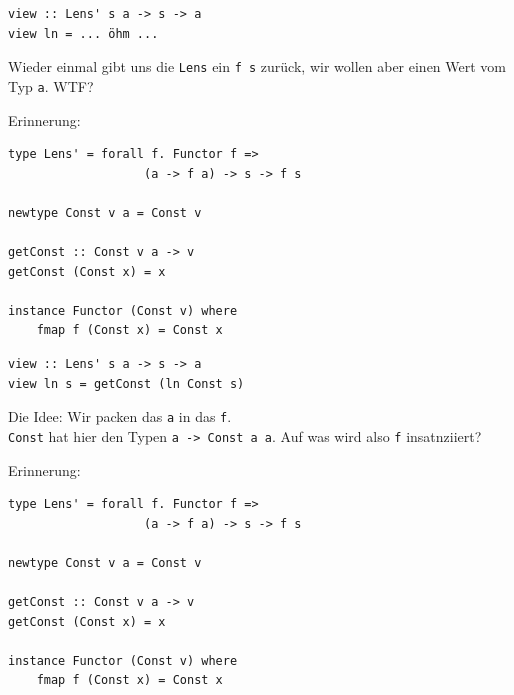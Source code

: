\documentclass{beamer}
\begin{document}

\begin{frame}[fragile]

\begin{verbatim}
view :: Lens' s a -> s -> a
view ln = ... öhm ... 
\end{verbatim}
\pause
Wieder einmal gibt uns die \texttt{Lens} ein \texttt{f s} zurück, wir wollen aber 
einen Wert vom Typ \texttt{a}. WTF?
\pause

Erinnerung:
\begin{verbatim}
type Lens' = forall f. Functor f =>
                   (a -> f a) -> s -> f s
                   
newtype Const v a = Const v

getConst :: Const v a -> v
getConst (Const x) = x

instance Functor (Const v) where
    fmap f (Const x) = Const x
\end{verbatim}

\end{frame}


\begin{frame}[fragile]

\begin{verbatim}
view :: Lens' s a -> s -> a
view ln s = getConst (ln Const s) 
\end{verbatim}
\smallskip

Die Idee: Wir packen das \texttt{a} in das \texttt{f}.\\ \texttt{Const} hat hier den Typen \texttt{a -> Const a a}. Auf was wird also \texttt{f} insatnziiert?

\bigskip
Erinnerung:
\begin{verbatim}
type Lens' = forall f. Functor f =>
                   (a -> f a) -> s -> f s

newtype Const v a = Const v

getConst :: Const v a -> v
getConst (Const x) = x

instance Functor (Const v) where
    fmap f (Const x) = Const x
\end{verbatim}

\end{frame}

\end{document}

